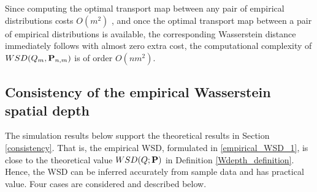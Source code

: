 \documentclass{imsart}
\numberwithin{equation}{section}
\begin{document}
Since computing the optimal transport map between any pair of empirical distributions costs $O(m^2)$ \cite{peyre2019computational}, and once the optimal transport map between a pair of empirical distributions is available, the corresponding Wasserstein distance immediately follows with almost zero extra cost,
the computational complexity of $ {\rm WSD}(Q_m, \mathbf{P}_{n,m})$ is of order $O(nm^2)$.

\subsection{Consistency of the empirical Wasserstein spatial depth}\label{simulation_consistency}
The simulation results below support the theoretical results in Section \ref{consistency}. That is, the empirical WSD, formulated in \eqref{empirical_WSD_1}, is close to the theoretical value $ {\rm WSD}(Q; {\bf P})$ in Definition \ref{Wdepth_definition}. Hence, the WSD can be inferred accurately from sample data and has practical value. 
Four cases are considered and described below.
\end{document}
